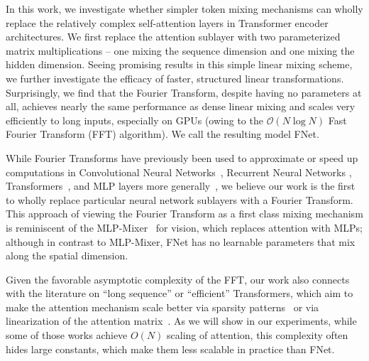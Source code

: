\documentclass[11pt]{article}
\renewcommand{\O}[1]{$\mathcal{O}(#1)$}
\begin{document}
In this work, we investigate whether simpler token mixing mechanisms can wholly replace the relatively complex self-attention layers in Transformer encoder architectures. We first replace the attention sublayer with two parameterized matrix multiplications -- one mixing the sequence dimension and one mixing the hidden dimension. Seeing promising results in this simple linear mixing scheme, we further investigate the efficacy of faster, structured linear transformations. Surprisingly, we find that the Fourier Transform, despite having no parameters at all, achieves nearly the same performance as dense linear mixing and scales very efficiently to long inputs, especially on GPUs (owing to the \O{N \log N} Fast Fourier Transform (FFT) algorithm). We call the resulting model FNet. 

While Fourier Transforms have previously been used to approximate or speed up computations in Convolutional Neural Networks~\citep{el2004fast, mathieu2014fast, highlander2016very, pratt2017fcnn, lin2018fft, chitsaz2020acceleration, goldberg2020rethinking}, Recurrent Neural Networks \citep{koplon1997using, zhang2000forenet, zhang2018learning},  Transformers~\citep{choromanski2020masked, tamkin2020language}, and MLP layers more generally~\citep{cheng2015exploration, moczulski2015acdc, sindhwani2015structured}, we believe our work is the first to wholly replace particular neural network sublayers with a Fourier Transform. This approach of viewing the Fourier Transform as a first class mixing mechanism is reminiscent of the MLP-Mixer~\citep{tolstikhin2021mlp} for vision, which replaces attention with MLPs; although in contrast to MLP-Mixer, FNet has no learnable parameters that mix along the spatial dimension.

Given the favorable asymptotic complexity of the FFT, our work also connects with the literature on ``long sequence'' or ``efficient'' Transformers, which aim to make the attention mechanism scale better via sparsity patterns~\citep{child2019generating, qiu2019blockwise, parmar2018image, beltagy2020longformer, ainslie2020etc, zaheer2020big, wang2020linformer, tay2020sparse, tay2020synthesizer, kitaev2020reformer, roy2021efficient, vyas2020fast, liu2018generating} or via linearization of the attention matrix~\citep{katharopoulos2020transformers, choromanski2020rethinking, peng2021random}. As we will show in our experiments, while some of those works achieve $O(N)$ scaling of attention, this complexity often hides large constants, which make them less scalable in practice than FNet.
\end{document}

